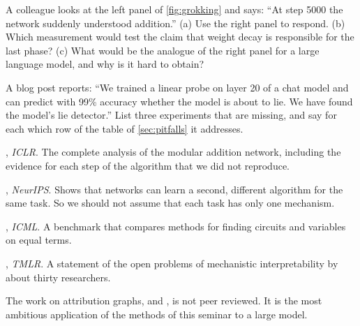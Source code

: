 \begin{exercise}\label{ex:sudden}
A colleague looks at the left panel of \cref{fig:grokking} and says: ``At step 5000 the network suddenly
understood addition.'' (a) Use the right panel to respond. (b) Which measurement would test the
claim that weight decay is responsible for the last phase? (c) What would be the analogue of the right panel for
a large language model, and why is it hard to obtain?
\end{exercise}

\begin{exercise}\label{ex:critique}
A blog post reports: ``We trained a linear probe on layer 20 of a chat model and can predict with 99\% accuracy
whether the model is about to lie. We have found the model's lie detector.'' List three experiments that are
missing, and say for each which row of the table of \cref{sec:pitfalls} it addresses.
\end{exercise}

\begin{readinglist}
\item \citet{nanda2023progress}, \emph{ICLR}. The complete analysis of the modular addition network, including
the evidence for each step of the algorithm that we did not reproduce.
\item \citet{zhong2023clock}, \emph{NeurIPS}. Shows that networks can learn a second, different algorithm for the
same task. So we should not assume that each task has only one mechanism.
\item \citet{mueller2025mib}, \emph{ICML}. A benchmark that compares methods for finding circuits and variables on
equal terms.
\item \citet{sharkey2025open}, \emph{TMLR}. A statement of the open problems of mechanistic interpretability by about thirty
researchers.
\item The work on attribution graphs, \citet{ameisen2025circuit} and \citet{lindsey2025biology}, is not peer
reviewed. It is the most ambitious application of the methods of this seminar to a large model.
\end{readinglist}
